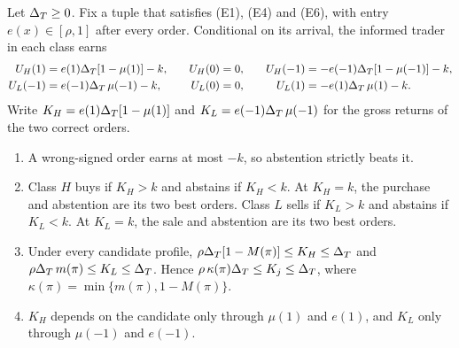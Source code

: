 \begin{lemma}\label{lem:trading}
Let \(\Delta_T\ge0\). Fix a tuple that satisfies (E1), (E4) and (E6), with entry \(e(x)\in[\rho,1]\) after every order.
Conditional on its arrival, the informed trader in each class earns
\[
\begin{aligned}
U_H(1)&=e(1)\Delta_T[1-\mu(1)]-k,&\quad U_H(0)&=0,&\quad U_H(-1)&=-e(-1)\Delta_T[1-\mu(-1)]-k,\\
U_L(-1)&=e(-1)\Delta_T\,\mu(-1)-k,&\quad U_L(0)&=0,&\quad U_L(1)&=-e(1)\Delta_T\,\mu(1)-k.
\end{aligned}
\]
Write \(K_H=e(1)\Delta_T[1-\mu(1)]\) and \(K_L=e(-1)\Delta_T\,\mu(-1)\) for the gross returns of the two correct orders.
\begin{enumerate}[label=(\alph*),leftmargin=2em]
\item A wrong-signed order earns at most \(-k\), so abstention strictly beats it.
\item Class \(H\) buys if \(K_H>k\) and abstains if \(K_H<k\). At \(K_H=k\), the purchase and abstention are its
two best orders. Class \(L\) sells if \(K_L>k\) and abstains if \(K_L<k\). At \(K_L=k\), the sale and abstention
are its two best orders.
\item Under every candidate profile, \(\rho\Delta_T[1-M(\pi)]\le K_H\le\Delta_T\) and \(\rho\Delta_T\,m(\pi)\le K_L\le\Delta_T\).
Hence \(\rho\,\kappa(\pi)\Delta_T\le K_j\le\Delta_T\), where \(\kappa(\pi)=\min\{m(\pi),1-M(\pi)\}\).
\item \(K_H\) depends on the candidate only through \(\mu(1)\) and \(e(1)\), and \(K_L\) only through
\(\mu(-1)\) and \(e(-1)\).
\end{enumerate}
\end{lemma}

